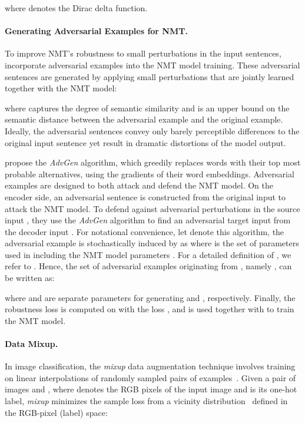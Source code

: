\documentclass[11pt,a4paper]{article}
\newcommand{\mixup}{\textit{mixup}\xspace}
\begin{document}
where  denotes the Dirac delta function.
 
\paragraph{Generating Adversarial Examples for NMT.} 
To improve NMT's robustness to small perturbations in the input sentences, \citet{Cheng:19} incorporate adversarial examples into the NMT model training. These adversarial sentences  are generated by applying small perturbations that are jointly learned together with the NMT model:

where  captures the degree of semantic similarity and
 is an upper bound on the semantic distance between the adversarial example and the original example. Ideally, the adversarial sentences convey only barely perceptible differences to the original input sentence yet result in dramatic distortions of the model output.

\citet{Cheng:19} propose the \emph{AdvGen} algorithm, which greedily replaces words with their top  most probable alternatives, using the gradients of their word embeddings. 
Adversarial examples are designed to both attack and defend the NMT model. On the encoder side, an adversarial sentence  is constructed from the original input  to attack the NMT model. To defend against adversarial perturbations in the source input , they use the \emph{AdvGen} algorithm to find an adversarial target input  from the decoder input .
For notational convenience, let  denote this algorithm, the adversarial example  is stochastically induced by  as  where  is the set of parameters used in  including the NMT model parameters . For a detailed definition of , we refer to \cite{Cheng:19}.
Hence, the set of adversarial examples originating from , namely , can be written as:

where  and  are separate parameters for generating  and , respectively. 
Finally, the robustness loss  is computed on  with the loss , and is used together with  to train the NMT model.

\paragraph{Data Mixup.}
In image classification, the \mixup data augmentation technique involves training on linear interpolations of randomly sampled pairs of examples~\cite{Zhang:18}.
Given a pair of images  and , where  denotes the RGB pixels of the input image and  is its one-hot label, \mixup minimizes the sample loss from a vicinity distribution~\cite{chapelle2001vicinal}  defined in the RGB-pixel (label) space:
\end{document}
